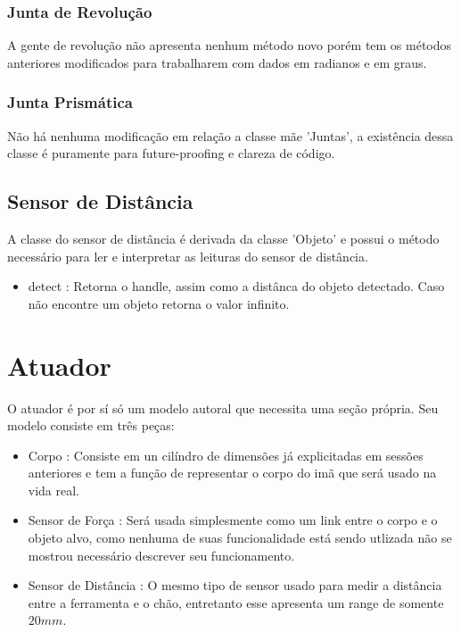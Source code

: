 \documentclass{article}
\begin{document}
        \subsubsection{Junta de Revolução}

            A gente de revolução não apresenta nenhum método novo porém tem os métodos anteriores modificados para trabalharem com dados em radianos e em graus.
        \subsubsection{Junta Prismática}

            Não há nenhuma modificação em relação a classe mãe 'Juntas', a existência dessa classe é puramente para future-proofing e clareza de código. 
        \subsection{Sensor de Distância}

            A classe do sensor de distância é derivada da classe 'Objeto' e possui o método necessário para ler e interpretar as leituras do sensor de distância.
            \begin{itemize}
                \item detect : Retorna o handle, assim como a distânca do objeto detectado. Caso não encontre um objeto retorna o valor infinito.
            \end{itemize}
    \section{Atuador}

            O atuador é por sí só um modelo autoral que necessita uma seção própria. Seu modelo consiste em três peças:
            \begin{itemize}
                \item Corpo : Consiste em un cilíndro de dimensões já explicitadas em sessões anteriores e tem a função de representar o corpo do imã que será usado na vida real.
                \item Sensor de Força : Será usada simplesmente como um link entre o corpo e o objeto alvo, como nenhuma de suas funcionalidade está sendo utlizada não se mostrou necessário descrever seu funcionamento.
                \item Sensor de Distância : O mesmo tipo de sensor usado para medir a distância entre a ferramenta e o chão, entretanto esse apresenta um range de somente \(20mm\).
            \end{itemize}
\end{document}
